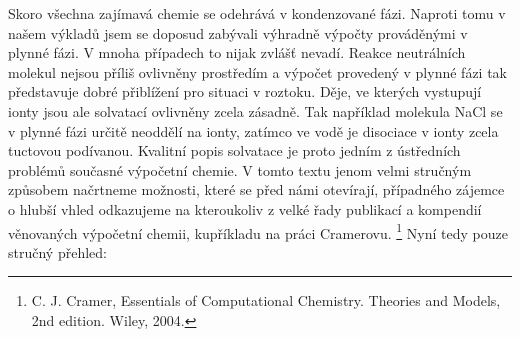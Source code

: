 Skoro všechna zajímavá chemie se odehrává v kondenzované fázi. Naproti tomu v našem výkladů jsem se doposud zabývali výhradně výpočty prováděnými v plynné fázi. V mnoha případech to nijak zvlášť nevadí. Reakce neutrálních molekul nejsou příliš ovlivněny prostředím a výpočet provedený v plynné fázi tak představuje dobré přiblížení pro situaci v roztoku.
Děje, ve kterých vystupují ionty jsou ale solvatací ovlivněny zcela zásadně. Tak například molekula NaCl se v plynné fázi určitě neoddělí na ionty, zatímco ve vodě je disociace v ionty zcela tuctovou podívanou.
Kvalitní popis solvatace je proto jedním z ústředních problémů současné výpočetní chemie. V tomto textu jenom velmi stručným způsobem načrtneme možnosti, které se před námi otevírají, případného zájemce o hlubší vhled odkazujeme na kteroukoliv z velké řady publikací a kompendií věnovaných výpočetní chemii, kupříkladu na práci Cramerovu. \footnote{C. J. Cramer, Essentials of Computational Chemistry. Theories and Models, 2nd edition. Wiley, 2004.} Nyní tedy pouze stručný přehled:

